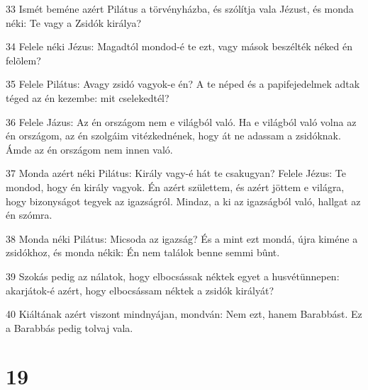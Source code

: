 \par 33 Ismét beméne azért Pilátus a törvényházba, és szólítja vala Jézust, és monda néki: Te vagy a Zsidók királya?
\par 34 Felele néki Jézus: Magadtól mondod-é te ezt, vagy mások beszélték néked én felõlem?
\par 35 Felele Pilátus: Avagy zsidó vagyok-e én? A te néped és a papifejedelmek adtak téged az én kezembe: mit cselekedtél?
\par 36 Felele Jázus: Az én országom nem e világból való. Ha e világból való volna az én országom, az én szolgáim vitézkednének, hogy át ne adassam a zsidóknak. Ámde az én országom nem innen való.
\par 37 Monda azért néki Pilátus: Király vagy-é hát te csakugyan? Felele Jézus: Te mondod, hogy én király vagyok. Én azért születtem, és azért jöttem e világra, hogy bizonyságot tegyek az igazságról. Mindaz, a ki az igazságból való, hallgat az én szómra.
\par 38 Monda néki Pilátus: Micsoda az igazság? És a mint ezt mondá, újra kiméne a zsidókhoz, és monda nékik: Én nem találok benne semmi bûnt.
\par 39 Szokás pedig az nálatok, hogy elbocsássak néktek egyet a husvétünnepen: akarjátok-é azért, hogy elbocsássam néktek a zsidók királyát?
\par 40 Kiáltának azért viszont mindnyájan, mondván: Nem ezt, hanem Barabbást. Ez a Barabbás pedig tolvaj vala.

\chapter{19}

